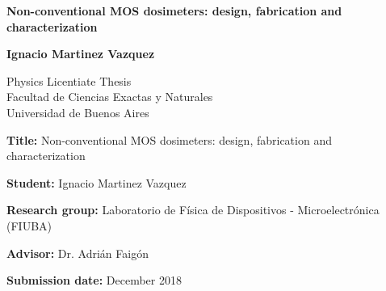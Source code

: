 \begin{titlepage}
   \begin{center}
\vspace*{1cm}

\Huge
\textbf{Non-conventional MOS dosimeters: design, fabrication and characterization}

\vspace{0.5cm}
 
\vspace{1.5cm}
 
\Large
\textbf{Ignacio Martinez Vazquez}

\vfill

Physics Licentiate Thesis\\
Facultad de Ciencias Exactas y Naturales\\
Universidad de Buenos Aires\\
 
       \vspace{0.8cm}
 
   \end{center}
\end{titlepage}
%
\textbf{Title:} Non-conventional MOS dosimeters: design, fabrication and characterization

\textbf{Student:} Ignacio Martinez Vazquez 

\textbf{Research group:} Laboratorio de Física de Dispositivos - Microelectrónica (FIUBA)

\textbf{Advisor:} Dr. Adrián Faigón

\textbf{Submission date:} December 2018

\vfill
\newpage
